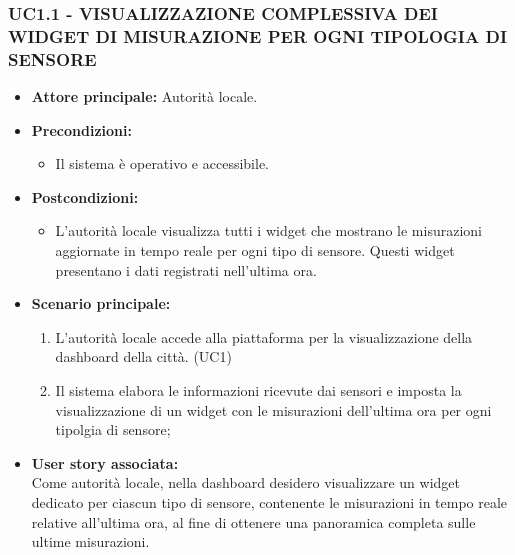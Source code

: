 \subsubsection{UC1.1 - VISUALIZZAZIONE COMPLESSIVA DEI WIDGET DI MISURAZIONE PER OGNI TIPOLOGIA DI SENSORE}
\begin{itemize}
    \item \textbf{Attore principale:} Autorità locale.
    \item \textbf{Precondizioni:}
        \begin{itemize}
            \item Il sistema è operativo e accessibile.
        \end{itemize}
    \item \textbf{Postcondizioni:}
        \begin{itemize}
            \item L'autorità locale visualizza tutti i widget che mostrano le misurazioni aggiornate in tempo reale per ogni tipo di sensore. Questi widget presentano i dati registrati nell'ultima ora.
        \end{itemize}
    \item \textbf{Scenario principale:}
        \begin{enumerate}
            \item L'autorità locale accede alla piattaforma per la visualizzazione della dashboard della città. (UC1)
            \item Il sistema elabora le informazioni ricevute dai sensori e imposta la visualizzazione di un widget con le misurazioni dell'ultima ora per ogni tipolgia di sensore;
        \end{enumerate}
    \item \textbf{User story associata:} \\
        Come autorità locale, nella dashboard desidero visualizzare un widget dedicato per ciascun tipo di sensore, contenente le misurazioni in tempo reale relative all'ultima ora, al fine di ottenere una panoramica completa sulle ultime misurazioni.
\end{itemize}

